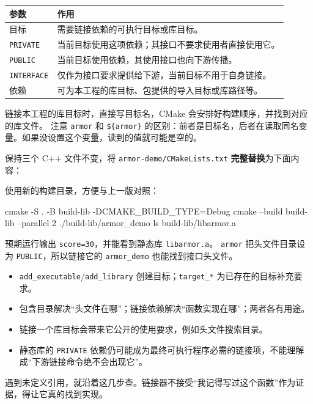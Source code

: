 \begin{center}
\begin{tabular}{p{}p{}}
\toprule[1.5pt]
参数 & 作用 \\
\midrule[1pt]
目标 & 需要链接依赖的可执行目标或库目标。\\
\texttt{PRIVATE} & 当前目标使用这项依赖；其接口不要求使用者直接使用它。\\
\texttt{PUBLIC} & 当前目标使用依赖，其使用接口也向下游传播。\\
\texttt{INTERFACE} & 仅作为接口要求提供给下游，当前目标不用于自身链接。\\
依赖 & 可为本工程的库目标、包提供的导入目标或库路径等。\\
\bottomrule[1.5pt]
\end{tabular}
\end{center}
链接本工程的库目标时，直接写目标名，CMake 会安排好构建顺序，并找到对应的库文件。
注意 \texttt{armor} 和 \texttt{\$\{armor\}} 的区别：前者是目标名，后者在读取同名变量。如果没设置这个变量，读到的值就可能是空的。

\begin{example}[把实现拆成静态库]
\label{ex:armor-library}
保持三个 C++ 文件不变，将 \texttt{armor-demo/CMakeLists.txt} \textbf{完整替换}为下面内容：


使用新的构建目录，方便与上一版对照：
\begin{tbash}
cmake -S . -B build-lib -DCMAKE_BUILD_TYPE=Debug
cmake --build build-lib --parallel 2
./build-lib/armor_demo
ls build-lib/libarmor.a
\end{tbash}
预期运行输出 \texttt{score=30}，并能看到静态库 \texttt{libarmor.a}。
\texttt{armor} 把头文件目录设为 \texttt{PUBLIC}，所以链接它的 \texttt{armor\_demo} 也能找到接口头文件。
\end{example}

\begin{conclusion}
\begin{itemize}
    \item \texttt{add\_executable}/\texttt{add\_library} 创建目标；\texttt{target\_*} 为已存在的目标补充要求。
    \item 包含目录解决“头文件在哪”；链接依赖解决“函数实现在哪”；两者各有用途。
    \item 链接一个库目标会带来它公开的使用要求，例如头文件搜索目录。
    \item 静态库的 \texttt{PRIVATE} 依赖仍可能成为最终可执行程序必需的链接项，不能理解成“下游链接命令绝不会出现它”。
\end{itemize}
遇到未定义引用，就沿着这几步查。链接器不接受“我记得写过这个函数”作为证据，得让它真的找到实现。
\end{conclusion}

